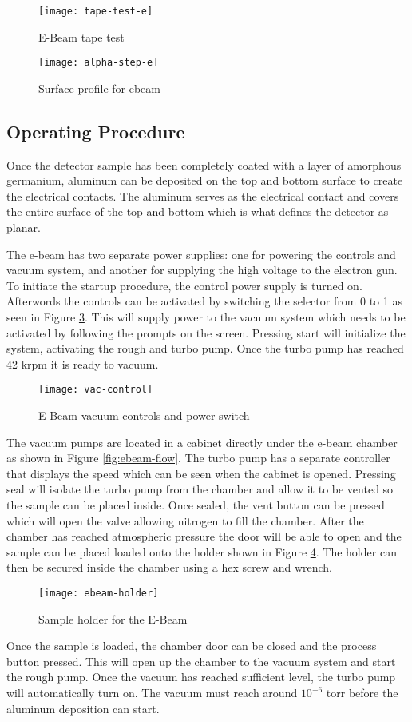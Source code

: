\begin{figure}[htpb]
\centering
\texttt{[image: tape-test-e]}
\caption{E-Beam tape test}
\label{fig:tape-test-e}
\end{figure}

\begin{figure}[htpb]
\centering
\texttt{[image: alpha-step-e]}
\caption{Surface profile for ebeam}
\label{fig:alpha-step-e}
\end{figure}

\subsection{Operating Procedure}
Once the detector sample has been completely coated with a layer of amorphous germanium, aluminum can be deposited on the top and bottom surface to create the electrical contacts.
The aluminum serves as the electrical contact and covers the entire surface of the top and bottom which is what defines the detector as planar.

The e-beam has two separate power supplies: one for powering the controls and vacuum system, and another for supplying the high voltage to the electron gun.
To initiate the startup procedure, the control power supply is turned on.
Afterwords the controls can be activated by switching the selector from 0 to 1 as seen in Figure \ref{fig:vac-control}.
This will supply power to the vacuum system which needs to be activated by following the prompts on the screen.
Pressing start will initialize the system, activating the rough and turbo pump.
Once the turbo pump has reached 42 krpm it is ready to vacuum.
\begin{figure}[htpb]
\centering
\texttt{[image: vac-control]}
\caption{E-Beam vacuum controls and power switch}
\label{fig:vac-control}
\end{figure}

The vacuum pumps are located in a cabinet directly under the e-beam chamber as shown in Figure \ref{fig:ebeam-flow}.
The turbo pump has a separate controller that displays the speed which can be seen when the cabinet is opened.
Pressing seal will isolate the turbo pump from the chamber and allow it to be vented so the sample can be placed inside.
Once sealed, the vent button can be pressed which will open the valve allowing nitrogen to fill the chamber.
After the chamber has reached atmospheric pressure the door will be able to open and the sample can be placed loaded onto the holder shown in Figure \ref{fig:ebeam-holder}.
The holder can then be secured inside the chamber using a hex screw and wrench.
\begin{figure}[htpb]
\centering
\texttt{[image: ebeam-holder]}
\caption{Sample holder for the E-Beam}
\label{fig:ebeam-holder}
\end{figure}
Once the sample is loaded, the chamber door can be closed and the process button pressed.
This will open up the chamber to the vacuum system and start the rough pump.
Once the vacuum has reached sufficient level, the turbo pump will automatically turn on.
The vacuum must reach around $10^{-6}$ torr before the aluminum deposition can start.

